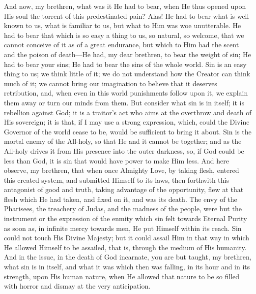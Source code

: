 And now, my brethren, what was it He had to bear, when He thus
opened upon His soul the torrent of this predestinated pain? Alas! He
had to bear what is well known to us, what is familiar to us, but what
to Him was woe unutterable. He had to bear that which is so easy a
thing to us, so natural, so welcome, that we cannot conceive of it as
of a great endurance, but which to Him had the scent and the poison of
death—He had, my dear brethren, to bear the weight of sin; He had to
bear your sins; He had to bear the sins of the whole world. Sin is an
easy thing to us; we think little of it; we do not understand how the
Creator can think much of it; we cannot bring our imagination to
believe that it deserves retribution, and, when even in this world
punishments follow upon it, we explain them away or turn our minds
from them. But consider what sin is in itself; it is rebellion against
God; it is a traitor's act who aims at the overthrow and death of His
sovereign; it is that, if I may use a strong expression, which, could
the Divine Governor of the world cease to be, would be sufficient to
bring it about. Sin is the mortal enemy of the All-holy, so that He
and it cannot be together; and as the All-holy drives it from His
presence into the outer darkness, so, if God could be less than God,
it is sin that would have power to make Him less. And here observe, my
brethren, that when once Almighty Love, by taking flesh, entered this
created system, and submitted Himself to its laws, then forthwith this
antagonist of good and truth, taking advantage of the opportunity,
flew at that flesh which He had taken, and fixed on it, and was its
death. The envy of the Pharisees, the treachery of Judas, and the
madness of the people, were but the instrument or the expression of
the enmity which sin felt towards Eternal Purity as soon as, in
infinite mercy towards men, He put Himself within its reach. Sin could
not touch His Divine Majesty; but it could assail Him in that way in
which He allowed Himself to be assailed, that is, through the medium
of His humanity. And in the issue, in the death of God incarnate, you
are but taught, my brethren, what sin is in itself, and what it was
which then was falling, in its hour and in its strength, upon His
human nature, when He allowed that nature to be so filled with horror
and dismay at the very anticipation.

